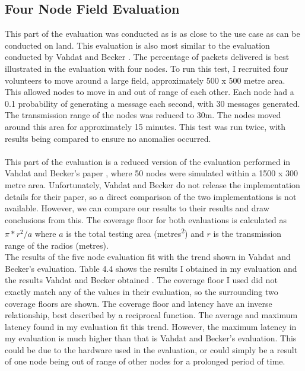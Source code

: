 \documentclass[12pt,a4paper]{report}
\begin{document}
\subsection{Four Node Field Evaluation}
This part of the evaluation was conducted as is as close to the use case as can be conducted on land. This evaluation is also most similar to the evaluation conducted by Vahdat and Becker \cite{epidemic}. The percentage of packets delivered is best illustrated in the evaluation with four nodes. To run this test, I recruited four volunteers to move around a large field, approximately 500 x 500 metre area. This allowed nodes to move in and out of range of each other. Each node had a 0.1 probability of generating a message each second, with 30 messages generated. The transmission range of the nodes was reduced to 30m. The nodes moved around this area for approximately 15 minutes. This test was run twice, with results being compared to ensure no anomalies occurred. \\ \\
This part of the evaluation is a reduced version of the evaluation performed in Vahdat and Becker's paper \cite{epidemic}, where 50 nodes were simulated within a 1500 x 300 metre area. Unfortunately, Vahdat and Becker do not release the implementation details for their paper, so a direct comparison of the two implementations is not available. However, we can compare our results to their results and draw conclusions from this. The coverage floor for both evaluations is calculated as $\pi * r^2 / a$ where $a$ is the total testing area (metres\textsuperscript{2}) and $r$ is the transmission range of the radios (metres).  \\ 
The results of the five node evaluation fit with the trend shown in Vahdat and Becker's evaluation. Table 4.4 shows the results I obtained in my evaluation and the results Vahdat and Becker obtained \cite{epidemic}. The coverage floor I used did not exactly match any of the values in their evaluation, so the surrounding two coverage floors are shown. The coverage floor and latency have an inverse relationship, best described by a reciprocal function. The average and maximum latency found in my evaluation fit this trend. However, the maximum latency in my evaluation is much higher than that is Vahdat and Becker's evaluation. This could be due to the hardware used in the evaluation, or could simply be a result of one node being out of range of other nodes for a prolonged period of time.\\ \\
\end{document}

